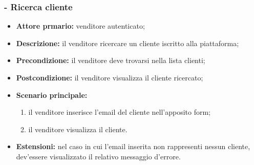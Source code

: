 \stepsubUserCase
\subsubsection{- Ricerca cliente}
\begin{itemize}
    \item \textbf{Attore prmario:} venditore autenticato;
    \item \textbf{Descrizione:} il venditore ricercare un cliente iscritto alla piattaforma;
    \item \textbf{Precondizione:} il venditore deve trovarsi nella lista clienti;
    \item \textbf{Postcondizione:} il venditore visualizza il cliente ricercato;
    \item \textbf{Scenario principale:}
          \begin{enumerate}
              \item il venditore inserisce l'email del cliente nell'apposito form;
              \item il venditore visualizza il cliente.
          \end{enumerate}
    \item \textbf{Estensioni:} nel caso in cui l'email inserita non rappresenti nessun cliente, dev'essere visualizzato il relativo messaggio d'errore.
\end{itemize}



\stepUserCase
